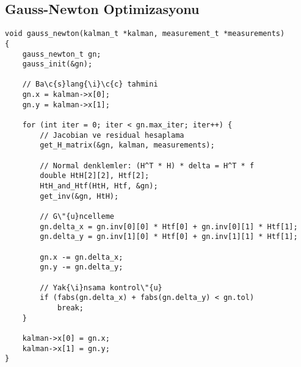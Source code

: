 \documentclass[12pt,a4paper]{article}
\begin{document}
\subsection{Gauss-Newton Optimizasyonu}
\begin{lstlisting}[caption=Gauss-Newton Başlangıç Tahmini]
void gauss_newton(kalman_t *kalman, measurement_t *measurements)
{
    gauss_newton_t gn;
    gauss_init(&gn);
    
    // Ba\c{s}lang{\i}\c{c} tahmini
    gn.x = kalman->x[0];
    gn.y = kalman->x[1];
    
    for (int iter = 0; iter < gn.max_iter; iter++) {
        // Jacobian ve residual hesaplama
        get_H_matrix(&gn, kalman, measurements);
        
        // Normal denklemler: (H^T * H) * delta = H^T * f
        double HtH[2][2], Htf[2];
        HtH_and_Htf(HtH, Htf, &gn);
        get_inv(&gn, HtH);
        
        // G\"{u}ncelleme
        gn.delta_x = gn.inv[0][0] * Htf[0] + gn.inv[0][1] * Htf[1];
        gn.delta_y = gn.inv[1][0] * Htf[0] + gn.inv[1][1] * Htf[1];
        
        gn.x -= gn.delta_x;
        gn.y -= gn.delta_y;
        
        // Yak{\i}nsama kontrol\"{u}
        if (fabs(gn.delta_x) + fabs(gn.delta_y) < gn.tol)
            break;
    }
    
    kalman->x[0] = gn.x;
    kalman->x[1] = gn.y;
}
\end{lstlisting}
\end{document}
